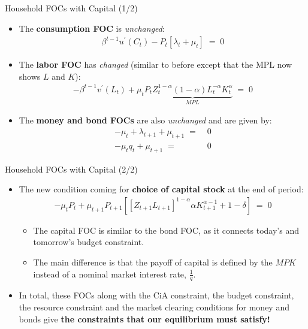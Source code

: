 \documentclass[10pt,c,aspectratio=1610,handout]{beamer}
\begin{document}
\begin{frame}{Household FOCs with Capital (1/2)}%
  \begin{itemize}%
    \item[$\blacktriangleright$] The \textbf{consumption FOC} is \emph{unchanged}:%
    \begin{align*}%
      \beta^{t-1}u^{\prime}(C_{t}) -P_{t} \left[ \lambda_{t}+\mu_{t}\right] \; = \; 0%
    \end{align*}%
    \vspace*{0.15in}%
    \pause%
    \item[$\blacktriangleright$] The \textbf{labor FOC} has \emph{changed} (similar to before except that the MPL now shows $L$ and $K$):%
    \begin{align*}%
      -\beta^{t-1} v^{\prime}(L_{t}) + \mu _{t} P_{t} \underbrace{Z_{t}^{1-\alpha} (1-\alpha) L_{t}^{-\alpha} K_{t}^{\alpha}}_{MPL} \; = \; 0%
    \end{align*}%
    \vspace*{0.15in}%
    \pause%
    \item[$\blacktriangleright$] The \textbf{money and bond FOCs} are also \emph{unchanged} and are given by:%
    \begin{align*}%
      -\mu_{t} + \lambda_{t+1} + \mu_{t+1} \; = & \; 0\\%
      -\mu_{t} q_{t} + \mu_{t+1} \; = & \; 0%
    \end{align*}%
  \end{itemize}%
\end{frame}%
\begin{frame}{Household FOCs with Capital (2/2)}%
  \begin{itemize}%
    \item[$\blacktriangleright$] The new condition coming for \textbf{choice of capital stock} at the end of period:%
    \begin{align*}%
      -\mu _{t} P_{t} + \mu_{t+1} P_{t+1} \left[ \left[ Z_{t+1} L_{t+1} \right]^{1-\alpha} \alpha K_{t+1}^{\alpha-1} + 1 - \delta \right] \; = \; 0%
    \end{align*}%
    \pause%
    \begin{itemize}%
      \item[$\rightarrow$] The capital FOC is similar to the bond FOC, as it connects today's and tomorrow's budget constraint.%
      \item[$\rightarrow$] The main difference is that the payoff of capital is defined by the $MPK$ instead of a nominal market interest rate, $\frac{1}{q}$.%
    \end{itemize}%
    \vspace*{0.15in}%
    \pause%
    \item[$\blacktriangleright$] In total, these FOCs along with the CiA constraint, the budget constraint, the resource constraint and the market clearing conditions for money and bonds give \textbf{the constraints that our equilibrium must satisfy!}%
  \end{itemize}%
\end{frame}%
\end{document}

